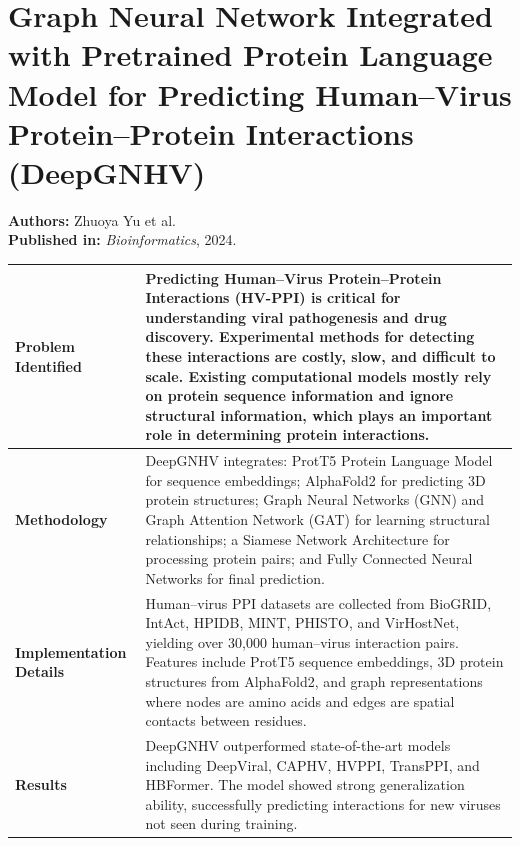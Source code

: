 \documentclass[12pt,a4paper]{report}
\begin{document}
\newpage

\section{Graph Neural Network Integrated with Pretrained Protein Language Model for Predicting Human–Virus Protein–Protein Interactions (DeepGNHV)}
\textbf{Authors:} Zhuoya Yu et al. \\
\textbf{Published in:} \textit{Bioinformatics}, 2024.

\begin{table}[H]
\centering
\renewcommand{\arraystretch}{1.5}
\begin{tabular}{|p{}|p{}|}
\hline
\textbf{Problem Identified} & Predicting Human–Virus Protein–Protein Interactions (HV-PPI) is critical for understanding viral pathogenesis and drug discovery. Experimental methods for detecting these interactions are costly, slow, and difficult to scale. Existing computational models mostly rely on protein sequence information and ignore structural information, which plays an important role in determining protein interactions. \\ \hline
\textbf{Methodology} & DeepGNHV integrates: ProtT5 Protein Language Model for sequence embeddings; AlphaFold2 for predicting 3D protein structures; Graph Neural Networks (GNN) and Graph Attention Network (GAT) for learning structural relationships; a Siamese Network Architecture for processing protein pairs; and Fully Connected Neural Networks for final prediction. \\ \hline
\textbf{Implementation Details} & Human–virus PPI datasets are collected from BioGRID, IntAct, HPIDB, MINT, PHISTO, and VirHostNet, yielding over 30,000 human–virus interaction pairs. Features include ProtT5 sequence embeddings, 3D protein structures from AlphaFold2, and graph representations where nodes are amino acids and edges are spatial contacts between residues. \\ \hline
\textbf{Results} & DeepGNHV outperformed state-of-the-art models including DeepViral, CAPHV, HVPPI, TransPPI, and HBFormer. The model showed strong generalization ability, successfully predicting interactions for new viruses not seen during training. \\ \hline
\end{tabular}
\end{table}

\newpage
\end{document}
